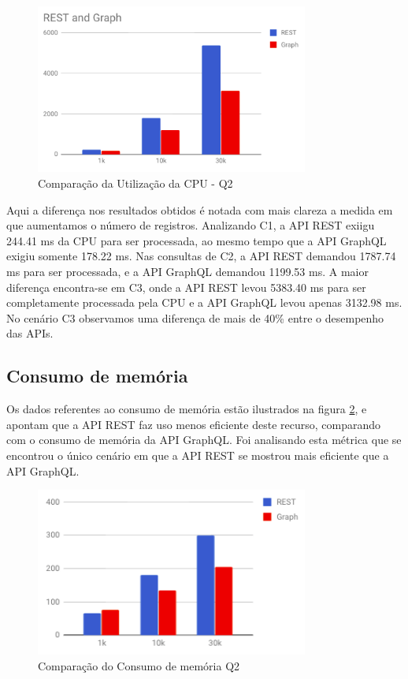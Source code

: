 \begin{figure}[htbp]
    \centering
    \includegraphics[width=0.8\textwidth]{figuras/q2-cpu.png}
    \caption{Comparação da Utilização da CPU - Q2}
    \label{fig:q2-cpu}
    \author{fonte: Autor}
\end{figure}

Aqui a diferença nos resultados obtidos é notada com mais clareza a medida em que aumentamos o número de registros. Analizando C1, a API REST exiigu 244.41 ms da CPU para ser processada, ao mesmo tempo que a API GraphQL exigiu somente 178.22 ms. Nas consultas de C2, a API REST demandou 1787.74 ms para ser processada, e a API GraphQL demandou 1199.53 ms. A maior diferença encontra-se em C3, onde a API REST levou 5383.40 ms para ser completamente processada pela CPU e a API GraphQL levou apenas 3132.98 ms. No cenário C3 observamos uma diferença de mais de 40\% entre o desempenho das APIs.

\subsection{Consumo de memória}

Os dados referentes ao consumo de memória estão ilustrados na figura \ref{fig:q2-mem}, e apontam que a API REST faz uso menos eficiente deste recurso, comparando com o consumo de memória da API GraphQL. Foi analisando esta métrica que se encontrou o único cenário em que a API REST se mostrou mais eficiente que a API GraphQL.

\begin{figure}[htbp]
    \centering
    \includegraphics[width=0.8\textwidth]{figuras/q2-mem.png}
    \caption{Comparação do Consumo de memória Q2}
    \label{fig:q2-mem}
    \author{fonte: Autor}
\end{figure}


